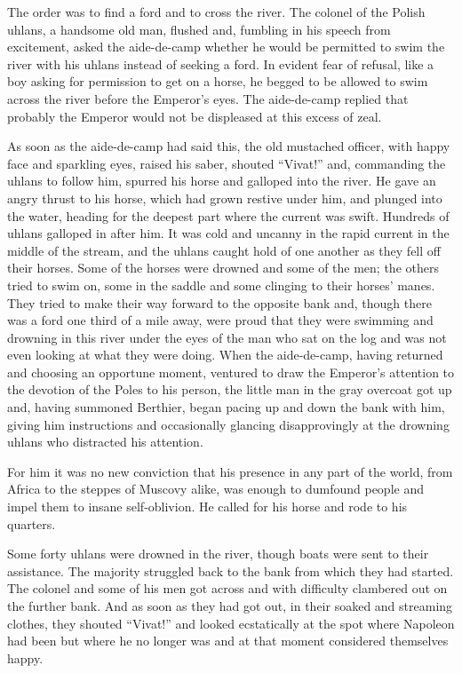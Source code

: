 The order was to find a ford and to cross the river. The colonel
of the Polish uhlans, a handsome old man, flushed and, fumbling
in his speech from excitement, asked the aide-de-camp whether he
would be permitted to swim the river with his uhlans instead of
seeking a ford. In evident fear of refusal, like a boy asking for
permission to get on a horse, he begged to be allowed to swim
across the river before the Emperor's eyes.  The aide-de-camp
replied that probably the Emperor would not be displeased at this
excess of zeal.

As soon as the aide-de-camp had said this, the old mustached
officer, with happy face and sparkling eyes, raised his saber,
shouted ``Vivat!''  and, commanding the uhlans to follow him,
spurred his horse and galloped into the river. He gave an angry
thrust to his horse, which had grown restive under him, and
plunged into the water, heading for the deepest part where the
current was swift. Hundreds of uhlans galloped in after him. It
was cold and uncanny in the rapid current in the middle of the
stream, and the uhlans caught hold of one another as they fell
off their horses. Some of the horses were drowned and some of the
men; the others tried to swim on, some in the saddle and some
clinging to their horses' manes. They tried to make their way
forward to the opposite bank and, though there was a ford one
third of a mile away, were proud that they were swimming and
drowning in this river under the eyes of the man who sat on the
log and was not even looking at what they were doing. When the
aide-de-camp, having returned and choosing an opportune moment,
ventured to draw the Emperor's attention to the devotion of the
Poles to his person, the little man in the gray overcoat got up
and, having summoned Berthier, began pacing up and down the bank
with him, giving him instructions and occasionally glancing
disapprovingly at the drowning uhlans who distracted his
attention.

For him it was no new conviction that his presence in any part of
the world, from Africa to the steppes of Muscovy alike, was
enough to dumfound people and impel them to insane
self-oblivion. He called for his horse and rode to his quarters.

Some forty uhlans were drowned in the river, though boats were
sent to their assistance. The majority struggled back to the bank
from which they had started. The colonel and some of his men got
across and with difficulty clambered out on the further bank. And
as soon as they had got out, in their soaked and streaming
clothes, they shouted ``Vivat!''  and looked ecstatically at the
spot where Napoleon had been but where he no longer was and at
that moment considered themselves happy.

